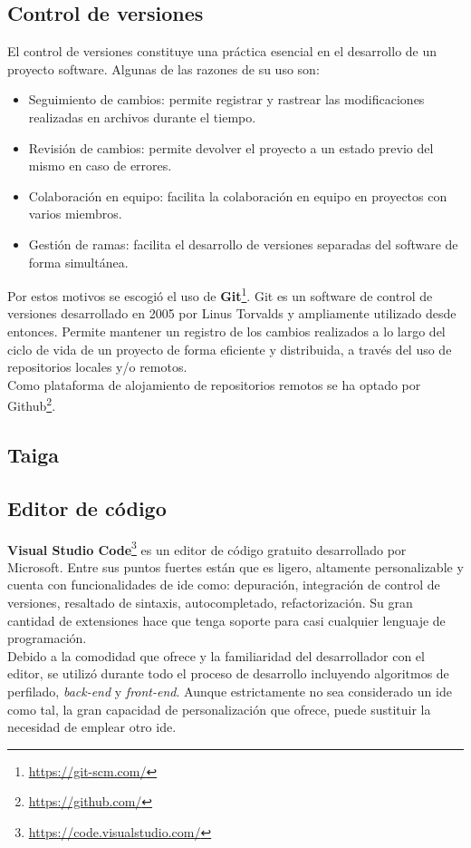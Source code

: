 \subsection{Control de versiones}
El control de versiones constituye una práctica esencial en el desarrollo de un proyecto software. Algunas de las razones de su uso son:
\begin{itemize}
    \item Seguimiento de cambios: permite registrar y rastrear las modificaciones realizadas en archivos durante el tiempo.
    \item Revisión de cambios: permite devolver el proyecto a un estado previo del mismo en caso de errores.
    \item Colaboración en equipo: facilita la colaboración en equipo en proyectos con varios miembros.
    \item Gestión de ramas: facilita el desarrollo de versiones separadas del software de forma simultánea.
\end{itemize}
Por estos motivos se escogió el uso de \textbf{Git}\footnote{\url{https://git-scm.com/}}. Git es un software de control de versiones desarrollado en 2005 por Linus Torvalds y ampliamente utilizado desde entonces. Permite mantener un registro de los cambios realizados a lo largo del ciclo de vida de un proyecto de forma eficiente y distribuida, a través del uso de repositorios locales y/o remotos.\\
Como plataforma de alojamiento de repositorios remotos se ha optado por Github\footnote{\url{https://github.com/}}. %
\subsection{Taiga}

\subsection{Editor de código}
\textbf{Visual Studio Code}\footnote{\url{https://code.visualstudio.com/}} es un editor de código gratuito desarrollado por Microsoft. Entre sus puntos fuertes están que es ligero, altamente personalizable y cuenta con funcionalidades de \acrfull{ide} como: depuración, integración de control de versiones, resaltado de sintaxis, autocompletado, refactorización. Su gran cantidad de extensiones hace que tenga soporte para casi cualquier lenguaje de programación.\\
Debido a la comodidad que ofrece y la familiaridad del desarrollador con el editor, se utilizó durante todo el proceso de desarrollo incluyendo algoritmos de perfilado, \textit{back-end} y \textit{front-end}. Aunque estrictamente no sea considerado un \acrlong{ide} como tal, la gran capacidad de personalización que ofrece, puede sustituir la necesidad de emplear otro \acrlong{ide}.%
